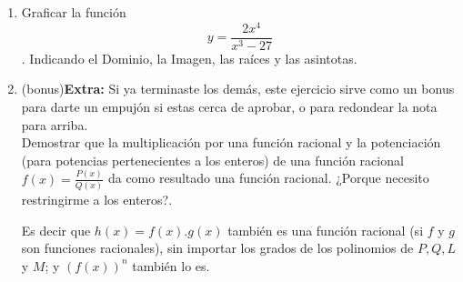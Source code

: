 \documentclass[a4paper,spanish]{exam}
\begin{document}
\begin{enumerate}
\begin{minipage}{.5\textwidth}
\end{minipage}
		
		
		\item  Graficar la función \[ y=\frac{2x^4}{x^3-27}  \]. Indicando el Dominio, la Imagen, las raíces y las asintotas.
		
		\item (bonus)\textbf{Extra:}
		Si ya terminaste los demás, este ejercicio sirve como un bonus para darte un empujón si estas cerca de aprobar, o para redondear la nota para arriba.\\
		
		Demostrar que la multiplicación por una función racional y la potenciación (para potencias pertenecientes a los enteros) de una función racional $f(x)=\frac{P(x)}{Q(x)}$ da como resultado una función racional. ¿Porque necesito restringirme a los enteros?.
		
		Es decir que $h(x)=f(x).g(x)$ también es una función racional (si $f$ y $g$ son funciones racionales), sin importar los grados de los polinomios de $P,Q,L$ y $M$; y $(f(x))^{n}$ también lo es. 
\end{enumerate}
\end{document}
